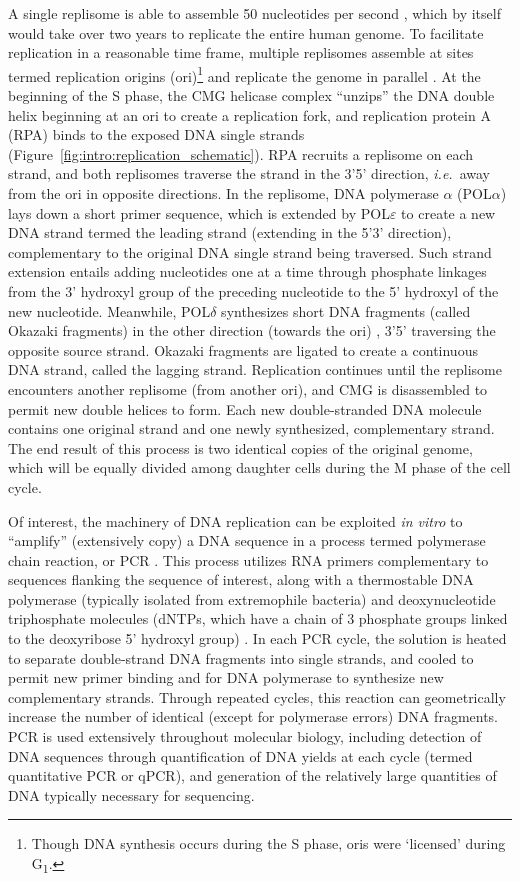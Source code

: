 A single replisome is able to assemble 50 nucleotides per second \cite{chali1_2014}, which by itself would take over two years to replicate the entire human genome. To facilitate replication in a reasonable time frame, multiple replisomes assemble at sites termed replication origins (ori)\footnote{Though DNA synthesis occurs during the S phase, oris were `licensed' during G\textsubscript{1}.} and replicate the genome in parallel \cite{bellelli2020}. At the beginning of the S phase, the CMG helicase complex ``unzips'' the DNA double helix beginning at an ori to create a replication fork, and replication protein A (RPA) binds to the exposed DNA single strands (Figure~\ref{fig:intro:replication_schematic}). RPA recruits a replisome on each strand, and both replisomes traverse the strand in the 3'\textrightarrow{}5' direction, \textit{i.e.}\ away from the ori in opposite directions. In the replisome, DNA polymerase $\alpha$ (POL$\alpha$) lays down a short primer sequence, which is extended by POL$\varepsilon$ to create a new DNA strand termed the leading strand (extending in the 5'\textrightarrow{}3' direction), complementary to the original DNA single strand being traversed. Such strand extension entails adding nucleotides one at a time through phosphate linkages from the 3' hydroxyl group of the preceding nucleotide to the 5' hydroxyl of the new nucleotide. Meanwhile, POL$\delta$ synthesizes short DNA fragments (called Okazaki fragments) in the other direction (towards the ori) \cite{langston2006}, 3'\textrightarrow{}5' traversing the opposite source strand. Okazaki fragments are ligated to create a continuous DNA strand, called the lagging strand. Replication continues until the replisome encounters another replisome (from another ori), and CMG is disassembled to permit new double helices to form. Each new double-stranded DNA molecule contains one original strand and one newly synthesized, complementary strand. The end result of this process is two identical copies of the original genome, which will be equally divided among daughter cells during the M phase of the cell cycle.

Of interest, the machinery of DNA replication can be exploited \textit{in vitro} to ``amplify'' (extensively copy) a DNA sequence in a process termed polymerase chain reaction, or PCR \cite{bartlett2003}. This process utilizes RNA primers complementary to sequences flanking the sequence of interest, along with a thermostable DNA polymerase (typically isolated from extremophile bacteria) and deoxynucleotide triphosphate molecules (dNTPs, which have a chain of 3 phosphate groups linked to the deoxyribose 5' hydroxyl group) \cite{green2018}. In each PCR cycle, the solution is heated to separate double-strand DNA fragments into single strands, and cooled to permit new primer binding and for DNA polymerase to synthesize new complementary strands. Through repeated cycles, this reaction can geometrically increase the number of identical (except for polymerase errors) DNA fragments. PCR is used extensively throughout molecular biology, including detection of DNA sequences through quantification of DNA yields at each cycle (termed quantitative PCR or qPCR), and generation of the relatively large quantities of DNA typically necessary for sequencing.

